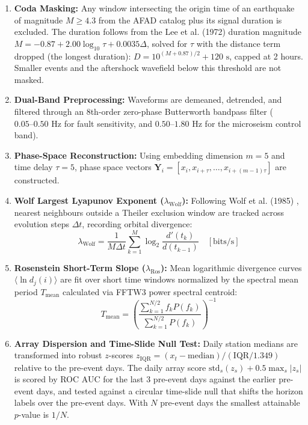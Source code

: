 \documentclass[11pt,a4paper]{article}
\begin{document}
\begin{enumerate}
    \item \textbf{Coda Masking:} Any window intersecting the origin time of an earthquake of magnitude $M \ge 4.3$ from the AFAD catalog plus its signal duration is excluded. The duration follows from the Lee et al. (1972) \cite{lee1972} duration magnitude $M = -0.87 + 2.00\log_{10}\tau + 0.0035\Delta$, solved for $\tau$ with the distance term dropped (the longest duration): $D = 10^{(M + 0.87)/2} + 120\text{ s}$, capped at 2 hours. Smaller events and the aftershock wavefield below this threshold are not masked.
    \item \textbf{Dual-Band Preprocessing:} Waveforms are demeaned, detrended, and filtered through an 8th-order zero-phase Butterworth bandpass filter ($0.05\text{--}0.50\text{ Hz}$ for fault sensitivity, and $0.50\text{--}1.80\text{ Hz}$ for the microseism control band).
    \item \textbf{Phase-Space Reconstruction:} Using embedding dimension $m = 5$ and time delay $\tau = 5$, phase space vectors $\mathbf{Y}_i = [x_i, x_{i+\tau}, \dots, x_{i+(m-1)\tau}]$ are constructed.
    \item \textbf{Wolf Largest Lyapunov Exponent ($\lambda_{\text{Wolf}}$):} Following Wolf et al. (1985) \cite{wolf1985}, nearest neighbours outside a Theiler exclusion window are tracked across evolution steps $\Delta t$, recording orbital divergence:
    \begin{equation}
    \lambda_{\text{Wolf}} = \frac{1}{M \Delta t} \sum_{k=1}^M \log_2 \frac{d'(t_k)}{d(t_{k-1})} \quad [\text{bits/s}]
    \end{equation}
    \item \textbf{Rosenstein Short-Term Slope ($\lambda_{\text{Ros}}$):} Mean logarithmic divergence curves $\langle \ln d_j(i) \rangle$ are fit over short time windows normalized by the spectral mean period $T_{\text{mean}}$ calculated via FFTW3 power spectral centroid:
    \begin{equation}
    T_{\text{mean}} = \left( \frac{\sum_{k=1}^{N/2} f_k P(f_k)}{\sum_{k=1}^{N/2} P(f_k)} \right)^{-1}
    \end{equation}
    \item \textbf{Array Dispersion and Time-Slide Null Test:} Daily station medians are transformed into robust $z$-scores $z_{\text{IQR}} = (x_t - \text{median}) / (\text{IQR}/1.349)$ relative to the pre-event days. The daily array score $\text{std}_s(z_s) + 0.5 \max_s |z_s|$ is scored by ROC AUC for the last 3 pre-event days against the earlier pre-event days, and tested against a circular time-slide null that shifts the horizon labels over the pre-event days. With $N$ pre-event days the smallest attainable $p$-value is $1/N$.
\end{enumerate}
\end{document}
